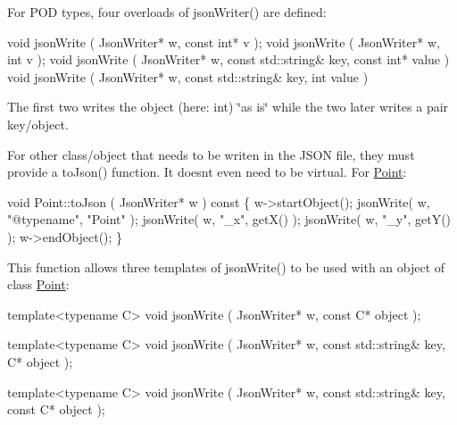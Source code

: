 For P\+OD types, four overloads of {\ttfamily json\+Writer()} are defined\+:


\begin{DoxyCode}
\textcolor{keywordtype}{void}  jsonWrite ( JsonWriter* w, \textcolor{keyword}{const} \textcolor{keywordtype}{int}* v );
\textcolor{keywordtype}{void}  jsonWrite ( JsonWriter* w,       \textcolor{keywordtype}{int}  v );
\textcolor{keywordtype}{void}  jsonWrite ( JsonWriter* w, \textcolor{keyword}{const} std::string& key, \textcolor{keyword}{const} \textcolor{keywordtype}{int}* value )
\textcolor{keywordtype}{void}  jsonWrite ( JsonWriter* w, \textcolor{keyword}{const} std::string& key,       \textcolor{keywordtype}{int}  value )
\end{DoxyCode}


The first two writes the object (here\+: {\ttfamily int}) \char`\"{}as is\char`\"{} while the two later writes a pair key/object.

For other class/object that needs to be writen in the J\+S\+ON file, they must provide a {\ttfamily to\+Json()} function. It doesn\textquotesingle{}t even need to be virtual. For \hyperlink{classHurricane_1_1Point}{Point}\+:


\begin{DoxyCode}
\textcolor{keywordtype}{void}  Point::toJson ( JsonWriter* w )\textcolor{keyword}{ const}
\textcolor{keyword}{}\{
  w->startObject();
  jsonWrite( w, \textcolor{stringliteral}{"@typename"}, \textcolor{stringliteral}{"Point"} );
  jsonWrite( w, \textcolor{stringliteral}{"\_x"}, getX() );
  jsonWrite( w, \textcolor{stringliteral}{"\_y"}, getY() );
  w->endObject();
\}
\end{DoxyCode}


This function allows three templates of {\ttfamily json\+Write()} to be used with an object of class \hyperlink{classHurricane_1_1Point}{Point}\+:


\begin{DoxyCode}
\textcolor{keyword}{template}<\textcolor{keyword}{typename} C>
\textcolor{keywordtype}{void}  jsonWrite ( JsonWriter* w, \textcolor{keyword}{const} C* \textcolor{keywordtype}{object} );

\textcolor{keyword}{template}<\textcolor{keyword}{typename} C>
\textcolor{keywordtype}{void}  jsonWrite ( JsonWriter* w, \textcolor{keyword}{const} std::string& key, C* \textcolor{keywordtype}{object} );

\textcolor{keyword}{template}<\textcolor{keyword}{typename} C>
\textcolor{keywordtype}{void}  jsonWrite ( JsonWriter* w, \textcolor{keyword}{const} std::string& key, \textcolor{keyword}{const} C* \textcolor{keywordtype}{object} );
\end{DoxyCode}


